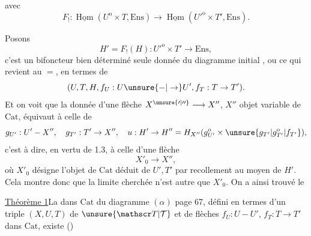 avec
\[
F_!:\underline{\operatorname{Hom}}(U^{\mathrm o}\times T,\mathrm{Ens})\longrightarrow
\underline{\operatorname{Hom}}({U'}^{\mathrm o}\times T',\mathrm{Ens}).
\]

 Posons
\[
H'=F_!(H):{U'}^{\mathrm o}\times T'\to\mathrm{Ens},
\]
c'est un bifoncteur bien déterminé  
seule donnée du diagramme initial , ou
ce qui revient au $=$, en termes de
\[
(U,T,H,f_U:U\unsure{-|\to}U',f_T:T\to T').
\]
Et on voit que la donnée d'une flèche
$X^{\unsure{\prime|\prime\prime}}\longrightarrow X''$, $X''$ objet variable de $\mathrm{Cat}$, équivaut
à celle de
\[
g_{U'}:U'-X'',\quad g_{T'}:T'\to X'',\quad
u:H'\to H''=H_{X''}(g_{U'}^{\mathrm o}\times \unsure{g_{T'}|g_{T'}^{\mathrm o}|f_{T'}}),
\]
c'est à dire, en vertu de 1.3, à celle d'une
flèche
\[
X'_0\longrightarrow X'',
\]
où $X'_0$ désigne l'objet de $\mathrm{Cat}$ déduit
de \unsure{(}$U',T'$ par recollement au moyen de $H'$.
Cela montre donc que la limite 
cherchée n'est autre que $X'_0$. On a
ainsi trouvé le

\uline{Théorème 1}\quad La   dans $\mathrm{Cat}$ du
diagramme $(\alpha)$ page 67, défini en termes
d'un triple $(X,U,T)$ de $\unsure{\mathscr T|\mathcal T}$ et de flèches
$f_U:U-U'$, $f_T:T\to T'$ dans $\mathrm{Cat}$, existe ()
